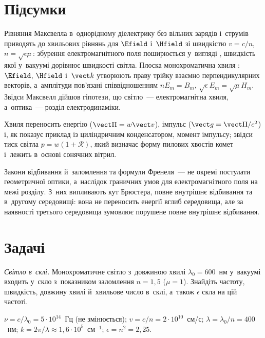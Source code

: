 \section*{Підсумки}
{}

Рівняння Максвелла в~однорідному діелектрику без вільних зарядів і~струмів приводять до хвильових рівнянь для $\Efield$ і~$\Hfield$ зі швидкістю $v=c/n$, $n=\sqrt{\epsilon\mu}$: збурення електромагнітного поля поширюється у~вигляді , швидкість якої у~вакуумі дорівнює швидкості світла. Плоска монохроматична хвиля : $\Efield$, $\Hfield$ і~$\vect k$ утворюють праву трійку взаємно перпендикулярних векторів, а~амплітуди пов'язані співвідношенням $nE_m=B_m$, $\sqrt\epsilon E_m=\sqrt\mu H_m$. Звідси Максвелл дійшов гіпотези, що світло~--- електромагнітна хвиля, а~оптика~--- розділ електродинаміки.

Хвиля переносить енергію ($\vect\Pi=w\vect v$), імпульс ($\vect g=\vect\Pi/c^2$) і, як показує приклад із циліндричним конденсатором, момент імпульсу; звідси тиск світла $p=w(1+\mathcal R)$, який визначає форму пилових хвостів комет і~лежить в~основі сонячних вітрил.

Закони відбивання й~заломлення та формули Френеля~--- не окремі постулати геометричної оптики, а~наслідок граничних умов для електромагнітного поля на межі розділу. З~них випливають кут Брюстера, повне внутрішнє відбивання та  в~другому середовищі: вона не переносить енергії вглиб середовища, але за наявності третього середовища зумовлює порушене повне внутрішнє відбивання.

\section*{Задачі}
{}


\begin{problem}\label{prb:LightInGlass}
	\emph{Світло в~склі.} Монохроматичне світло з~довжиною хвилі $\lambda_0=600$~нм у~вакуумі входить у~скло з~показником заломлення $n=1{,}5$ ($\mu=1$). Знайдіть частоту, швидкість, довжину хвилі й~хвильове число в~склі, а~також $\epsilon$ скла на цій частоті.
	\begin{solution}
		$\nu=c/\lambda_0=5\cdot10^{14}$~Гц (не змінюється); $v=c/n=2\cdot10^{10}$~см/с; $\lambda=\lambda_0/n=400$~нм; $k=2\pi/\lambda\approx1{,}6\cdot10^{5}$~см$^{-1}$; $\epsilon=n^2=2{,}25$.
	\end{solution}
\end{problem}

